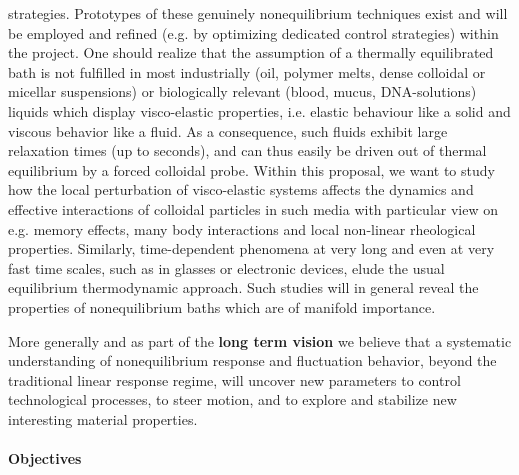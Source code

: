 strategies. Prototypes of these genuinely nonequilibrium techniques exist and will be
employed and refined (e.g. by optimizing dedicated control strategies) within the project.
One should realize that the assumption of a thermally equilibrated bath is not fulfilled in
most industrially (oil, polymer melts, dense colloidal or micellar suspensions) or
biologically relevant (blood, mucus, DNA-solutions) liquids which display visco-elastic
properties, i.e. elastic behaviour like a solid and viscous behavior like a fluid. As a
consequence, such fluids exhibit large relaxation times (up to seconds), and can thus easily
be driven out of thermal equilibrium by a forced colloidal probe. Within this proposal, we
want to study how the local perturbation of visco-elastic systems affects the dynamics and
effective interactions of colloidal particles in such media with particular view on
e.g. memory effects, many body interactions and local non-linear rheological properties.
Similarly, time-dependent phenomena at very long and even at very fast time scales, such as
in glasses or electronic devices, elude the usual equilibrium thermodynamic
approach.  Such studies will in general reveal the properties of nonequilibrium baths which
are of manifold importance.

More generally and as part of the {\bf long term vision} we believe that a systematic
understanding of nonequilibrium response and fluctuation behavior, beyond the traditional
linear response regime, will uncover new parameters to control technological processes, to
steer motion, and to explore and stabilize new interesting material properties.

\paragraph{Objectives}

